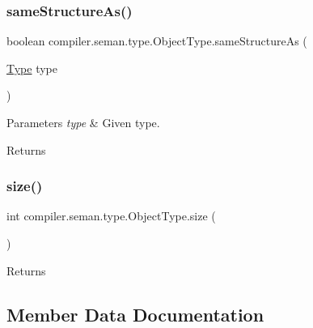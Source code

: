\subsubsection{\texorpdfstring{same\+Structure\+As()}{sameStructureAs()}}
{\footnotesize\ttfamily boolean compiler.\+seman.\+type.\+Object\+Type.\+same\+Structure\+As (\begin{DoxyParamCaption}\item[{\hyperlink{classcompiler_1_1seman_1_1type_1_1_type}{Type}}]{type }\end{DoxyParamCaption})}


\begin{DoxyParams}{Parameters}
{\em type} & Given type. \\
\hline
\end{DoxyParams}
\begin{DoxyReturn}{Returns}

\end{DoxyReturn}
\mbox{\label{classcompiler_1_1seman_1_1type_1_1_object_type_a23ca3ee5c26a01e3c4c4fe89fd27082a}} 
\subsubsection{\texorpdfstring{size()}{size()}}
{\footnotesize\ttfamily int compiler.\+seman.\+type.\+Object\+Type.\+size (\begin{DoxyParamCaption}{ }\end{DoxyParamCaption})}

\begin{DoxyReturn}{Returns}

\end{DoxyReturn}


\subsection{Member Data Documentation}
\mbox{\label{classcompiler_1_1seman_1_1type_1_1_object_type_a776328ea5119061ad683d36d7c8ff1ef}} 

